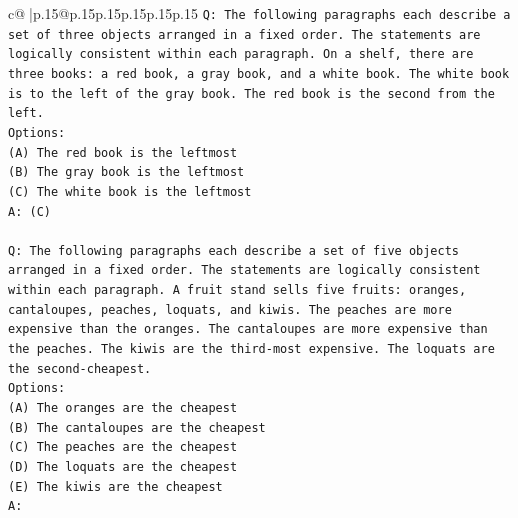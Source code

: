 \documentclass{article}
\begin{document}
{\begin{supertabular}{c@{$\;$}|p{.15\linewidth}@{}p{.15\linewidth}p{.15\linewidth}p{.15\linewidth}p{.15\linewidth}p{.15\linewidth}}
{{{\texttt{Q: The following paragraphs each describe a set of three objects arranged in a fixed order. The statements are logically consistent within each paragraph. On a shelf, there are three books: a red book, a gray book, and a white book. The white book is to the left of the gray book. The red book is the second from the left.} \\
\texttt{Options:} \\
\texttt{(A) The red book is the leftmost} \\
\texttt{(B) The gray book is the leftmost} \\
\texttt{(C) The white book is the leftmost} \\
\texttt{A: (C)} \\
\\ 
\texttt{Q: The following paragraphs each describe a set of five objects arranged in a fixed order. The statements are logically consistent within each paragraph. A fruit stand sells five fruits: oranges, cantaloupes, peaches, loquats, and kiwis. The peaches are more expensive than the oranges. The cantaloupes are more expensive than the peaches. The kiwis are the third{-}most expensive. The loquats are the second{-}cheapest.} \\
\texttt{Options:} \\
\texttt{(A) The oranges are the cheapest} \\
\texttt{(B) The cantaloupes are the cheapest} \\
\texttt{(C) The peaches are the cheapest} \\
\texttt{(D) The loquats are the cheapest} \\
\texttt{(E) The kiwis are the cheapest} \\
\texttt{A:} \\
            }
        }
    }
     \\ \\


\end{supertabular}}
\end{document}
